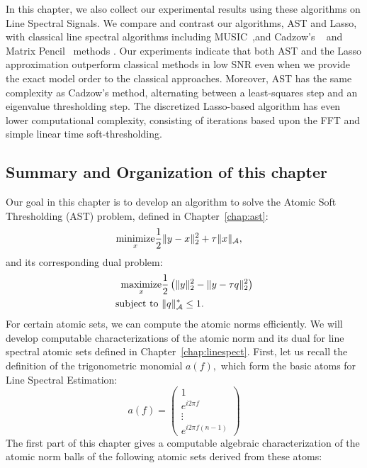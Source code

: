 In this chapter, we also collect our experimental results using these algorithms
on Line Spectral Signals. We compare and contrast our algorithms, AST and Lasso,
with classical line spectral algorithms including MUSIC~\cite{music},and
Cadzow's ~\cite{cadzow02} and Matrix Pencil~\cite{hua02} methods . Our
experiments indicate that both AST and the Lasso approximation outperform
classical methods in low SNR even when we provide the exact model order to the
classical approaches. Moreover, AST has the same complexity as Cadzow's method,
alternating between a least-squares step and an eigenvalue thresholding step.
The discretized Lasso-based algorithm has even lower computational complexity,
consisting of iterations based upon the FFT and simple linear time
soft-thresholding.



\subsection*{Summary and Organization of this chapter} %
\label{sub:main_results}
Our goal in this chapter is to develop an algorithm to solve the Atomic Soft
Thresholding (AST) problem, defined in Chapter~\ref{chap:ast}:
\begin{align}
\begin{split}
\mathop{\operatorname{minimize}}_x & \frac{1}{2}\lVert y-x\rVert_2^2 + \tau \lVert x\rVert_{\mathcal{A}},
\end{split}	
\end{align}
and its corresponding dual problem:
\begin{align}
\begin{split}
\mathop{\operatorname{maximize}}_x & \frac{1}{2}\left(\lVert y\rVert_2^2 - \lVert y-\tau q\rVert_2^2\right)\\
\text{subject to } & \lVert q\rVert_{\mathcal{A}}^* \leq 1. 
\end{split}
\end{align}
For certain atomic sets, we can compute the atomic norms efficiently. We will
develop computable characterizations of the atomic norm and its dual for line
spectral atomic sets defined in Chapter~\ref{chap:linespect}. First, let us
recall the definition of the trigonometric monomial $a(f),$ which form the basic
atoms for Line Spectral Estimation:
{\footnotesize
\[
a(f) = \begin{pmatrix}
	1\\
	e^{i 2\pi f}\\
	\vdots\\
	e^{i2\pi f (n-1)}
\end{pmatrix}
\]
}
The first part of this chapter gives a computable algebraic characterization of the atomic norm balls of the following atomic sets derived from these atoms:
